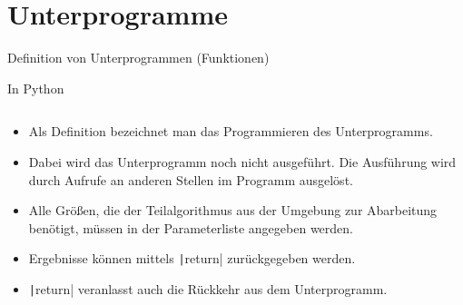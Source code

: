 \documentclass[xelatex,aspectratio=169]{beamer}
\begin{document}
\section{Unterprogramme}

\begin{frame}{Definition von Unterprogrammen (Funktionen)}

  \begin{block}{In Python}
    \inputminted{python}{src/algorithmus_unterprogramme.py}
  \end{block}
  \begin{itemize}
    \item Als Definition bezeichnet man das Programmieren des Unterprogramms.
    \item Dabei wird das Unterprogramm noch nicht ausgeführt. Die Ausführung wird durch Aufrufe an anderen Stellen im Programm ausgelöst.
    \item Alle Größen, die der Teilalgorithmus aus der Umgebung zur Abarbeitung benötigt, müssen in der Parameterliste angegeben werden.
    \item Ergebnisse können mittels \texttt|return| zurückgegeben werden.
    \item \texttt|return| veranlasst auch die Rückkehr aus dem Unterprogramm.
  \end{itemize}
\end{frame}
\end{document}
